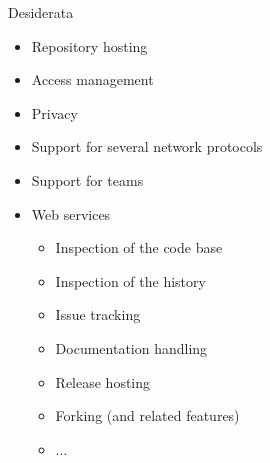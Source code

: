 \documentclass[presentation]{beamer}
\begin{document}
\begin{frame}{Desiderata}
    \begin{itemize}
        \item Repository hosting
        \item Access management
        \item Privacy
        \item Support for several network protocols
        \item Support for teams
        \item Web services
        \begin{itemize}
            \item Inspection of the code base
            \item Inspection of the history
            \item Issue tracking
            \item Documentation handling
            \item Release hosting
            \item Forking (and related features)
            \item ...
        \end{itemize}
    \end{itemize}
\end{frame}
\end{document}
